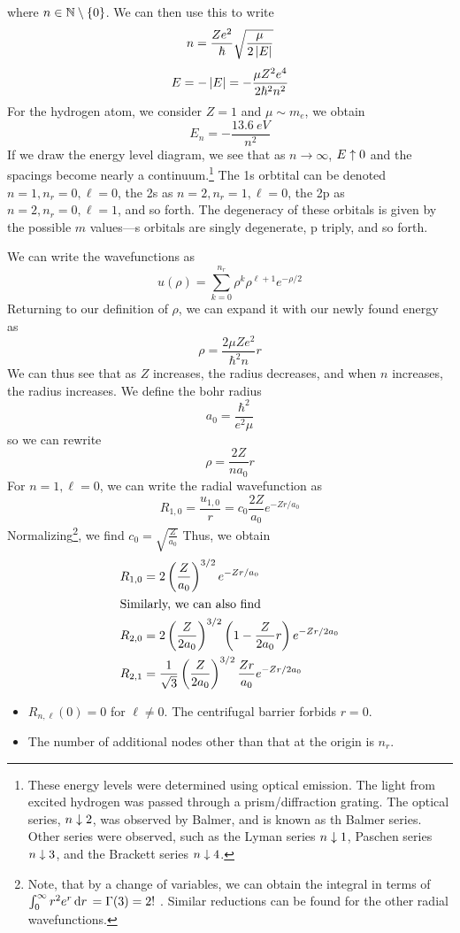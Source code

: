 where \(n\in\mathbb{N}\setminus\{0\}\). We can then use this to write
\[n = \frac{Ze^2}{\hbar}\sqrt{\frac{\mu}{2\left|E\right|}}\]
\begin{equation}
	E=-\left|E\right| = -\frac{\mu Z^2e^4}{2\hbar^2n^2}
\end{equation}
For the hydrogen atom, we consider \(Z=1\) and \(\mu\sim m_e\), we obtain
\[E_n = -\frac{\SI{13.6}{eV}}{n^2}\]
If we draw the energy level diagram, we see that as \(n\to\infty\), \(E\uparrow 0\) and the spacings become nearly a continuum.\footnote{These energy levels were determined using optical emission. The light from excited hydrogen was passed through a prism/diffraction grating. The optical series, \(n\downarrow 2\), was observed by Balmer, and is known as th Balmer series. Other series were observed, such as the Lyman series \(n\downarrow1\), Paschen series \(n\downarrow 3\), and the Brackett series \(n\downarrow 4\).} The 1s orbtital can be denoted \(n=1, n_r=0, \ell=0\), the 2s as \(n=2, n_r=1, \ell=0\), the 2p as \(n=2, n_r=0, \ell=1\), and so forth. The degeneracy of these orbitals is given by the possible \(m\) values---s orbitals are singly degenerate, p triply, and so forth. 

We can write the wavefunctions as 
\[u(\rho) = \sum_{k=0}^{n_r}\rho^k\rho^{\ell+1}e^{-\rho/2}\]
Returning to our definition of \(\rho\), we can expand it with our newly found energy as
\[\rho = \frac{2\mu Ze^2}{\hbar^2n}r\]
We can thus see that as \(Z\) increases, the radius decreases, and when \(n\) increases, the radius increases. We define the bohr radius
\[a_0 = \frac{\hbar^2}{e^2\mu}\]
so we can rewrite
\[\rho = \frac{2Z}{na_0}r\]
For \(n=1,\ell=0\), we can write the radial wavefunction as
\[R_{1,0} = \frac{u_{1,0}}{r} = c_0 \frac{2Z}{a_0}e^{-Zr/a_0}\]
Normalizing\footnote{Note, that by a change of variables, we can obtain the integral in terms of \(\int_0^\infty r^2 e^r\d{r} =\Gamma(3) = 2!\ \). Similar reductions can be found for the other radial wavefunctions.}, we find \(c_0 = \sqrt{\frac{Z}{a_0}}\)
Thus, we obtain
\begin{subequations}
	\begin{align}
		R_{1,0}&=2\left(\frac{Z}{a_0}\right)^{3/2}e^{-Zr/a_0}\\
		\intertext{Similarly, we can also find}
		R_{2,0}&=2\left(\frac{Z}{2a_0}\right)^{3/2}\left(1-\frac{Z}{2a_0}r\right)e^{-Zr/2a_0}\\
		R_{2,1}&=\frac{1}{\sqrt{3}}\left(\frac{Z}{2a_0}\right)^{3/2} \frac{Zr}{a_0}e^{-Zr/2a_0}
	\end{align}
\end{subequations}
\begin{aside}
	\begin{itemize}
		\item \(R_{n,\ell}(0)=0\) for \(\ell\neq 0\). The centrifugal barrier forbids \(r=0\).
		\item The number of additional nodes other than that at the origin is \(n_r\).
	\end{itemize}
\end{aside}

